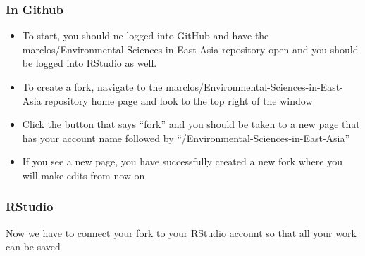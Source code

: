\documentclass[12pt]{../SOP4_alpha}\usepackage[]{graphicx}\usepackage[]{color}
\begin{document}
\subsubsection{In Github}
\begin{itemize}
\item To start, you should ne logged into GitHub and have the marclos/Environmental-Sciences-in-East-Asia repository open and you should be logged into RStudio as well. 
\item To create a fork, navigate to the marclos/Environmental-Sciences-in-East-Asia repository home page and look to the top right of the window
  \item Click the button that says “fork” and you should be taken to a new page that has your account name followed by “/Environmental-Sciences-in-East-Asia”
  \item If you see a new page, you have successfully created a new fork where you will make edits from now on 
\end{itemize}

\subsubsection{RStudio}
Now we have to connect your fork to your RStudio account so that all your work can be saved 
\end{document}
